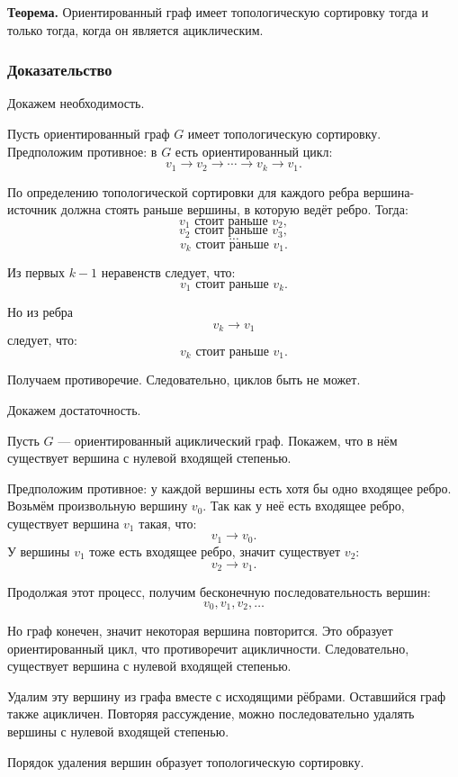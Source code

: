 \documentclass[12pt,a4paper]{article}
\begin{document}
\textbf{Теорема.}
Ориентированный граф имеет топологическую сортировку тогда и только тогда, когда он является ациклическим.

\subsubsection{Доказательство}

Докажем необходимость.

Пусть ориентированный граф $G$ имеет топологическую сортировку. Предположим противное: в $G$ есть ориентированный цикл:
\[
v_1 \rightarrow v_2 \rightarrow \cdots \rightarrow v_k \rightarrow v_1.
\]

По определению топологической сортировки для каждого ребра вершина-источник должна стоять раньше вершины, в которую ведёт ребро. Тогда:
\[
v_1 \text{ стоит раньше } v_2,
\]
\[
v_2 \text{ стоит раньше } v_3,
\]
\[
\cdots
\]
\[
v_k \text{ стоит раньше } v_1.
\]

Из первых $k-1$ неравенств следует, что:
\[
v_1 \text{ стоит раньше } v_k.
\]

Но из ребра
\[
v_k \rightarrow v_1
\]
следует, что:
\[
v_k \text{ стоит раньше } v_1.
\]

Получаем противоречие. Следовательно, циклов быть не может.

Докажем достаточность.

Пусть $G$ --- ориентированный ациклический граф. Покажем, что в нём существует вершина с нулевой входящей степенью.

Предположим противное: у каждой вершины есть хотя бы одно входящее ребро. Возьмём произвольную вершину $v_0$. Так как у неё есть входящее ребро, существует вершина $v_1$ такая, что:
\[
v_1 \rightarrow v_0.
\]
У вершины $v_1$ тоже есть входящее ребро, значит существует $v_2$:
\[
v_2 \rightarrow v_1.
\]

Продолжая этот процесс, получим бесконечную последовательность вершин:
\[
v_0, v_1, v_2, \ldots
\]

Но граф конечен, значит некоторая вершина повторится. Это образует ориентированный цикл, что противоречит ацикличности. Следовательно, существует вершина с нулевой входящей степенью.

Удалим эту вершину из графа вместе с исходящими рёбрами. Оставшийся граф также ацикличен. Повторяя рассуждение, можно последовательно удалять вершины с нулевой входящей степенью.

Порядок удаления вершин образует топологическую сортировку.
\end{document}
